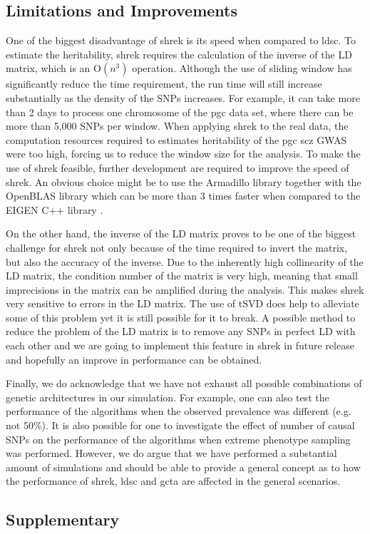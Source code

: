 	\subsection{Limitations and Improvements}
	One of the biggest disadvantage of \gls{shrek} is its speed when compared to \gls{ldsc}. 
	To estimate the heritability, \gls{shrek} requires the calculation of the inverse of the \gls{LD} matrix, which is an $\mathrm{O}(n^3)$ operation. 
	Although the use of sliding window has significantly reduce the time requirement, the run time will still increase substantially as the density of the \glspl{SNP} increases. 
	For example, it can take more than 2 days to process one chromosome of the \gls{pgc}  data set, where there can be more than 5,000 \glspl{SNP} per window.
	When applying \gls{shrek} to the real data, the computation resources required to estimates heritability of the \gls{pgc} \gls{scz} \gls{GWAS} were too high, forcing us to reduce the window size for the analysis. 
	To make the use of \gls{shrek} feasible, further development are required to improve the speed of \gls{shrek}.
	An obvious choice might be to use the Armadillo library \citep{Sanderson2010} together with the OpenBLAS library which can be more than 3 times faster when compared to the EIGEN C++ library \citep{Ho2011}.
	
	On the other hand, the inverse of the \gls{LD} matrix proves to be one of the biggest challenge for \gls{shrek} not only because of the time required to invert the matrix, but also the accuracy of the inverse.
	Due to the inherently high collinearity of the \gls{LD} matrix, the condition number of the matrix is very high, meaning that small imprecisions in the matrix can be amplified during the analysis. 
	This makes \gls{shrek} very sensitive to errors in the \gls{LD} matrix. 
	The use of \gls{tSVD} does help to alleviate some of this problem yet it is still possible for it to break.
	A possible method to reduce the problem of the \gls{LD} matrix is to remove any \glspl{SNP} in perfect \gls{LD} with each other and we are going to implement this feature in \gls{shrek} in future release and hopefully an improve in performance can be obtained.  
	
	Finally, we do acknowledge that we have not exhaust all possible combinations of genetic architectures in our simulation.
	For example, one can also test the performance of the algorithms when the observed prevalence was different (e.g. not 50\%).
	It is also possible for one to investigate the effect of number of causal \glspl{SNP} on the performance of the algorithms when extreme phenotype sampling was performed.
	However, we do argue that we have performed a substantial amount of simulations and should be able to provide a general concept as to how the performance of \gls{shrek}, \gls{ldsc} and \gls{gcta} are affected in the general scenarios.
	
	
\begin{singlespace}
\section{Supplementary}



\end{singlespace}
	